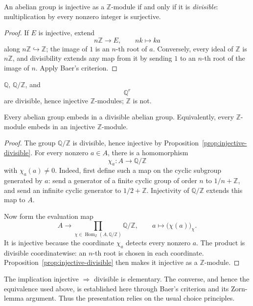\begin{proposition}\label{prop:injective-divisible}
An abelian group is injective as a \(\mathbb Z\)-module if and only if it is
\emph{divisible}: multiplication by every nonzero integer is surjective.
\end{proposition}
\begin{proof}
If \(E\) is injective, extend
\[
n\mathbb Z\longrightarrow E,\qquad nk\longmapsto ka
\]
along \(n\mathbb Z\hookrightarrow\mathbb Z\); the image of \(1\) is an
\(n\)-th root of \(a\).  Conversely, every ideal of \(\mathbb Z\) is
\(n\mathbb Z\), and divisibility extends any map from it by sending \(1\) to
an \(n\)-th root of the image of \(n\).  Apply Baer's criterion.
\end{proof}

\begin{example}
\(\mathbb Q\), \(\mathbb Q/\mathbb Z\), and
\[
\mathbb Q^r
\]
are divisible, hence injective \(\mathbb Z\)-modules; \(\mathbb Z\) is not.
\end{example}

\begin{proposition}
Every abelian group embeds in a divisible abelian group.  Equivalently, every
\(\mathbb Z\)-module embeds in an injective \(\mathbb Z\)-module.
\end{proposition}
\begin{proof}
The group \(\mathbb Q/\mathbb Z\) is divisible, hence injective by
Proposition~\ref{prop:injective-divisible}.  For every nonzero \(a\in A\),
there is a homomorphism
\[
\chi_a:A\longrightarrow\mathbb Q/\mathbb Z
\]
with \(\chi_a(a)\ne0\).  Indeed, first define such a map on the cyclic
subgroup generated by \(a\): send a generator of a finite cyclic group of
order \(n\) to \(1/n+\mathbb Z\), and send an infinite cyclic generator to
\(1/2+\mathbb Z\).  Injectivity of \(\mathbb Q/\mathbb Z\) extends this map
to \(A\).

Now form the evaluation map
\[
A\longrightarrow
\prod_{\chi\in\operatorname{Hom}_{\mathbb Z}(A,\mathbb Q/\mathbb Z)}
\mathbb Q/\mathbb Z,
\qquad
a\longmapsto\bigl(\chi(a)\bigr)_\chi.
\]
It is injective because the coordinate \(\chi_a\) detects every nonzero
\(a\).  The product is divisible coordinatewise: an \(n\)-th root is chosen
in each coordinate.  Proposition~\ref{prop:injective-divisible} then makes
it injective as a \(\mathbb Z\)-module.
\end{proof}

\begin{remark}
The implication injective \(\Rightarrow\) divisible is elementary.  The
converse, and hence the equivalence used above, is established here through
Baer's criterion and its Zorn-lemma argument.  Thus the presentation relies
on the usual choice principles.
\end{remark}

